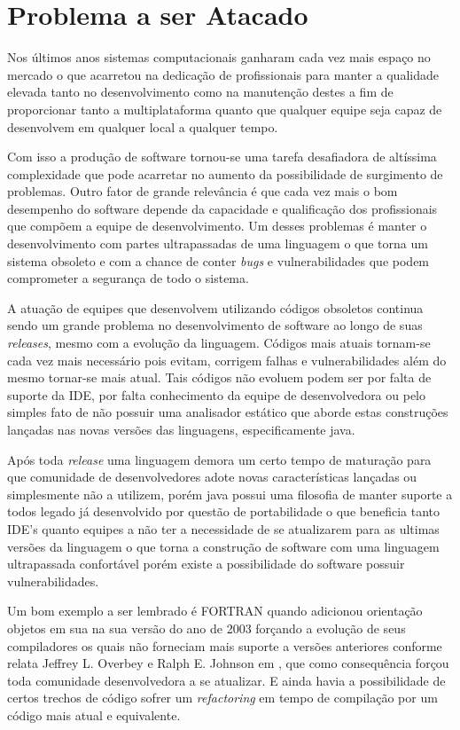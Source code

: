 \section{Problema a ser Atacado}

Nos últimos anos sistemas computacionais ganharam cada vez mais espaço no mercado o que acarretou na dedicação de profissionais para manter a qualidade elevada tanto no desenvolvimento como na manutenção destes a fim de proporcionar tanto a multiplataforma quanto que qualquer equipe seja capaz de desenvolvem em qualquer local a qualquer tempo.

Com isso a produção de software tornou-se uma tarefa desafiadora de altíssima complexidade que pode acarretar no aumento da possibilidade de surgimento de problemas. Outro fator de grande relevância é que cada vez mais o bom desempenho do software depende da capacidade e qualificação dos profissionais que compõem a equipe de desenvolvimento. Um desses problemas é manter o desenvolvimento com partes ultrapassadas de uma linguagem o que torna um sistema obsoleto e com a chance de conter {\it bugs} e vulnerabilidades que podem comprometer a segurança de todo o sistema.


A atuação de equipes que desenvolvem utilizando códigos obsoletos continua sendo um grande problema no desenvolvimento de software ao longo de suas \textit{releases}, mesmo com a evolução da linguagem. Códigos mais atuais tornam-se cada vez mais necessário pois evitam, corrigem falhas e vulnerabilidades além do mesmo tornar-se mais atual. Tais códigos não evoluem podem ser por falta de suporte da IDE, por falta conhecimento da equipe de desenvolvedora ou pelo simples fato de não possuir uma analisador estático que aborde estas construções lançadas nas novas versões das linguagens, especificamente java.


Após toda \textit{release} uma linguagem demora um certo tempo de maturação para que comunidade de desenvolvedores adote novas características lançadas ou simplesmente não a utilizem, porém java possui uma filosofia de manter suporte a todos legado já desenvolvido por questão de portabilidade o que beneficia tanto IDE's quanto equipes a não ter a necessidade de se atualizarem para as ultimas versões da linguagem o que torna a construção de software com uma linguagem ultrapassada confortável porém existe a possibilidade do software possuir vulnerabilidades.

Um bom exemplo a ser lembrado é FORTRAN quando adicionou orientação objetos em sua na sua versão do ano de 2003 forçando a evolução de seus compiladores os quais não forneciam mais suporte a versões anteriores conforme relata Jeffrey L. Overbey e Ralph E. Johnson em  \cite{Overbey:2009}, que como consequência forçou toda comunidade desenvolvedora a se atualizar. E ainda havia a possibilidade de certos trechos de código sofrer um \textit{refactoring} em tempo de compilação por um código mais atual e equivalente.

